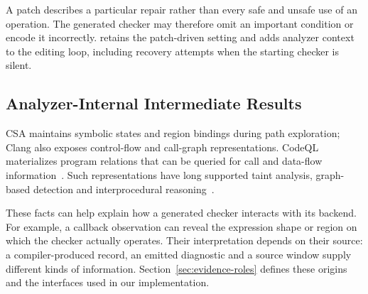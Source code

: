 A patch describes a particular repair rather than every safe and unsafe use of an operation.
The generated checker may therefore omit an important condition or encode it incorrectly.
\toolname retains the patch-driven setting and adds analyzer context to the editing loop, including recovery attempts when the starting checker is silent.

\subsection{Analyzer-Internal Intermediate Results}

CSA maintains symbolic states and region bindings during path exploration; Clang also exposes control-flow and call-graph representations.
CodeQL materializes program relations that can be queried for call and data-flow information~\cite{clangsaDocs,avgustinov2016ql,codeqlDocs}.
Such representations have long supported taint analysis, graph-based detection and interprocedural reasoning~\cite{livshits2005finding,jovanovic2006pixy,arzt2014flowdroid,yamaguchi2014cpg}.

These facts can help explain how a generated checker interacts with its backend.
For example, a callback observation can reveal the expression shape or region on which the checker actually operates.
Their interpretation depends on their source: a compiler-produced record, an emitted diagnostic and a source window supply different kinds of information.
Section~\ref{sec:evidence-roles} defines these origins and the interfaces used in our implementation.
